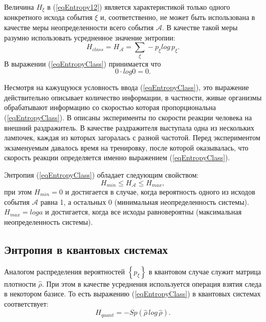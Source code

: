 Величина $H_{\xi}$ в (\ref{eqEntropy12}) является характеристикой
только одного конкретного исхода события $\xi$ и, соответственно, не
может быть использована в качестве меры неопределенности всего события
$\mathcal{A}$. В качестве такой меры разумно использовать усредненное
значение энтропии:
\begin{equation}
H_{class} = H_{\mathcal{A}} = \sum_{\xi} - p_{\xi} log \, p_{\xi}.
\label{eqEntropyClass}
\end{equation}
В выражении (\ref{eqEntropyClass}) принимается что
\begin{equation}
0 \cdot log 0 = 0.
\label{eqEntropyClassAdd}
\end{equation}

Несмотря на кажущуюся условность ввода (\ref{eqEntropyClass}), это
выражение действительно описывает количество информации, в частности,
живые организмы обрабатывают информацию со скоростью которая
пропорциональна (\ref{eqEntropyClass}). В \cite{bYaglom} 
описаны эксперименты по скорости реакции человека
на внешний раздражитель. В качестве раздражителя выступала одна из нескольких
лампочек, каждая из которых загоралась с разной частотой. Перед
экспериментом экзаменуемым давалось время на тренировку, после которой оказывалась,
что скорость реакции определяется именно выражением (\ref{eqEntropyClass}).

Энтропия (\ref{eqEntropyClass}) обладает следующим свойством:
\begin{equation}
H_{min} \le H_{\mathcal{A}} \le H_{max},
\label{eqEntropyClassProperty}
\end{equation}
при этом $H_{min} = 0$ и достигается в случае, когда вероятность одного
из исходов события $\mathcal{A}$ равна 1, а остальных 0 (минимальная
неопределенность системы). $H_{max} = log a$ и достигается, когда все
исходы равновероятны (максимальная неопределенность системы).

\subsection{Энтропия в квантовых системах}

Аналогом распределения вероятностей $\left\{p_{\xi}\right\}$ в
квантовом случае служит матрица плотности $\hat{\rho}$. При этом в
качестве усреднения используется операция взятия следа в некотором
базисе. То есть выражению (\ref{eqEntropyClass}) в квантовых системах
соответствует:
\begin{equation}
H_{quant} = - Sp \left(\hat{\rho} \, log \, \hat{\rho}\right).
\label{eqEntropyQuant}
\end{equation}

